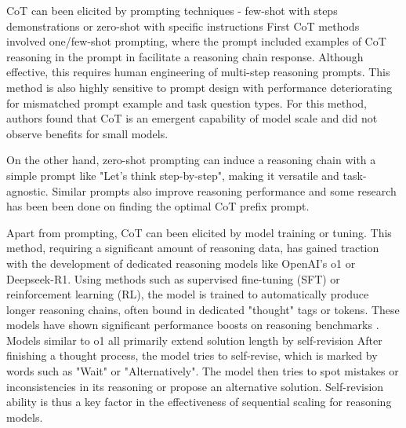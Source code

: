 CoT can been elicited by prompting techniques - few-shot with steps demonstrations or 
zero-shot with specific instructions\cite{wang2024chainofthoughtreasoningprompting}
First CoT methods\cite{wei2023chainofthoughtpromptingelicitsreasoning} involved one/few-shot prompting, 
where the prompt included examples of CoT reasoning in the prompt in facilitate a reasoning chain response.
Although effective, this requires human engineering of multi-step reasoning prompts.
This method is also highly sensitive to prompt design with performance deteriorating 
for mismatched prompt example and task question types\cite{NEURIPS2022_8bb0d291}.
For this method, authors found that CoT is an emergent capability of model scale 
and did not observe benefits for small models\cite{wei2023chainofthoughtpromptingelicitsreasoning}.

On the other hand, zero-shot prompting can induce a reasoning chain with a simple prompt like "Let's think step-by-step",
making it versatile and task-agnostic\cite{NEURIPS2022_8bb0d291}. Similar prompts also improve reasoning performance and 
some research has been been done on finding the optimal CoT prefix prompt.

Apart from prompting, CoT can been elicited by model training or tuning. 
This method, requiring a significant amount of reasoning data\cite{wang2024chainofthoughtreasoningprompting},
has gained traction with the development of dedicated reasoning models like OpenAI's o1 or Deepseek-R1.
Using methods such as supervised fine-tuning (SFT) or reinforcement learning (RL), the model is trained to
automatically produce longer reasoning chains, often bound in dedicated "thought" tags or tokens. These models have shown significant performance boosts on reasoning benchmarks .
Models similar to o1 all primarily extend solution length by self-revision\cite{zeng2025revisitingtesttimescalingo1like}
After finishing a thought process, the model tries to self-revise, which is marked by words such as "Wait" or "Alternatively". 
The model then tries to spot mistakes or inconsistencies in its reasoning or propose an alternative solution. 
Self-revision ability is thus a key factor in the effectiveness of sequential scaling for reasoning models. \cite{zeng2025revisitingtesttimescalingo1like}

